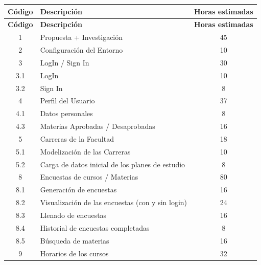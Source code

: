 \documentclass[a4paper]{article}
\begin{document}
\begin{longtable}{| c | l | c |}

\hline
\textbf{Código}		& 	\textbf{Descripción}											& 	\textbf{Horas estimadas} \\
\hline \hline
\endfirsthead

\hline
\textbf{Código}		& 	\textbf{Descripción}											& 	\textbf{Horas estimadas} \\
\hline \hline
\endhead

\endfoot

\endlastfoot


1					&	Propuesta + Investigación 										&	45\\
\hline
2					&	Configuración del Entorno 										&	10\\
\hline
3					&	LogIn / Sign In			 										&	30\\
\hline
3.1					&	LogIn					 										&	10\\
\hline		
3.2					&	Sign In					 										&	8\\
\hline
4					&	Perfil del Usuario												&	37\\
\hline
4.1					&	Datos personales												&	8\\
\hline
4.3					&	Materias Aprobadas / Desaprobadas								&	16\\
\hline
5					&	Carreras de la Facultad											&	18\\
\hline
5.1					&	Modelización de las Carreras									&	10\\
\hline
5.2					&	Carga de datos inicial de los planes de estudio				&	8\\
\hline
8					&	Encuestas de cursos / Materias									&	80\\
\hline
8.1					&	Generación de encuestas											&	16\\
\hline
8.2					&	Visualización de las encuestas (con y sin login)				&	24\\
\hline
8.3					&	Llenado de encuestas											&	16\\
\hline
8.4					&	Historial de encuestas completadas								&	8\\
\hline
8.5					&	Búsqueda de materias											&	16\\
\hline
9					&	Horarios de los cursos											&	32\\

\end{longtable}
\end{document}
